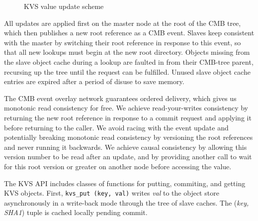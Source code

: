 \begin{figure}[ht]
\vspace{-.5cm}
\centering
\begin{subfigure}[a.b.c = 42.]{
  \label{fig:kvsupdate1}
}%
\end{subfigure}\hfill
\begin{subfigure}[a.b.c = 43 in progress.]{
  \label{fig:kvsupdate2}
}%
\end{subfigure}\hfill
\begin{subfigure}[a.b.c = 43 committed.]{
  \label{fig:kvsupdate3}
}%
\end{subfigure}\hfill
\caption{KVS value update scheme}
\vspace{-.5cm}
\label{fig:kvsupdate}
\end{figure}

All updates are applied first on the master node at the root of the
CMB tree, which then publishes a new root reference as a CMB event.
Slaves keep consistent with the master by switching their root reference
in response to this event, so that all new lookups must begin at the
new root directory.  Objects missing from the slave object cache during
a lookup are faulted in from their CMB-tree parent, recursing up the tree
until the request can be fulfilled.  Unused slave object cache entries are
expired after a period of disuse to save memory.

The CMB event overlay network guarantees ordered delivery, which gives
us monotonic read consistency for free.  We achieve read-your-writes
consistency by returning the new root reference in response to a commit
request and applying it before returning to the caller.  We avoid
racing with the event update and potentially breaking monotonic read
consistency by versioning the root references and never running it
backwards.  We achieve causal consistency by allowing this version number
to be read after an update, and by providing another call to wait for this
root version or greater on another node before accessing the value.

The KVS API includes classes of functions for putting, commiting, and
getting KVS objects.  
First, {\tt kvs\_put (key, val)}
writes {\em val} to the object store asynchronously in a write-back
mode through the tree of slave caches.
The ({\em key, SHA1}) tuple is cached locally pending commit.

